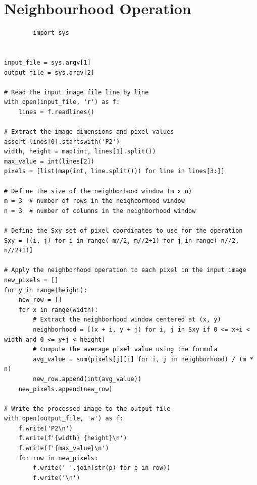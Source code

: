 \documentclass[a4paper,8pt]{article}
\begin{document}
        \section{Neighbourhood Operation}
        \begin{verbatim}
        import sys


input_file = sys.argv[1]
output_file = sys.argv[2]

# Read the input image file line by line
with open(input_file, 'r') as f:
    lines = f.readlines()

# Extract the image dimensions and pixel values
assert lines[0].startswith('P2')
width, height = map(int, lines[1].split())
max_value = int(lines[2])
pixels = [list(map(int, line.split())) for line in lines[3:]]

# Define the size of the neighborhood window (m x n)
m = 3  # number of rows in the neighborhood window
n = 3  # number of columns in the neighborhood window

# Define the Sxy set of pixel coordinates to use for the operation
Sxy = [(i, j) for i in range(-m//2, m//2+1) for j in range(-n//2, n//2+1)]

# Apply the neighborhood operation to each pixel in the input image
new_pixels = []
for y in range(height):
    new_row = []
    for x in range(width):
        # Extract the neighborhood window centered at (x, y)
        neighborhood = [(x + i, y + j) for i, j in Sxy if 0 <= x+i < width and 0 <= y+j < height]
        # Compute the average pixel value using the formula
        avg_value = sum(pixels[j][i] for i, j in neighborhood) / (m * n)
        new_row.append(int(avg_value))
    new_pixels.append(new_row)

# Write the processed image to the output file
with open(output_file, 'w') as f:
    f.write('P2\n')
    f.write(f'{width} {height}\n')
    f.write(f'{max_value}\n')
    for row in new_pixels:
        f.write(' '.join(str(p) for p in row))
        f.write('\n')


        \end{verbatim}
        
\end{document}
